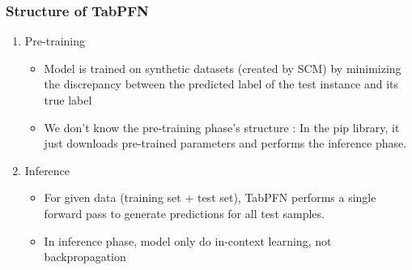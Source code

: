 \documentclass[compress]{beamer}
\begin{document}
\begin{frame}\frametitle{Structure of TabPFN}
	\begin{enumerate}
		\item Pre-training
		\begin{itemize}
			\item Model is trained on synthetic datasets (created by SCM) by
			minimizing the discrepancy between the predicted label of the
			test instance and its true label
			\item We don't know the pre-training phase's structure : In the pip library, it just downloads pre-trained parameters and performs the inference phase.
		\end{itemize}
		\item Inference
		\begin{itemize}
			\item For given data (training set + test set), TabPFN performs \alert{a single forward pass} to generate predictions for all test samples.
			\item In inference phase, model only do in-context learning, not backpropagation
		\end{itemize}
	\end{enumerate}
\end{frame}
\end{document}
